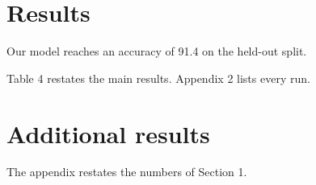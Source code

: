 \documentclass{article}
\begin{document}
\section{Results}

Our model reaches an accuracy of 91.4 on the held-out split.

\appendix
{}
 Table 4 restates the main results.
\newlength{\headsep} Appendix 2 lists every run.

\section{Additional results}

The appendix restates the numbers of Section 1.
\end{document}
